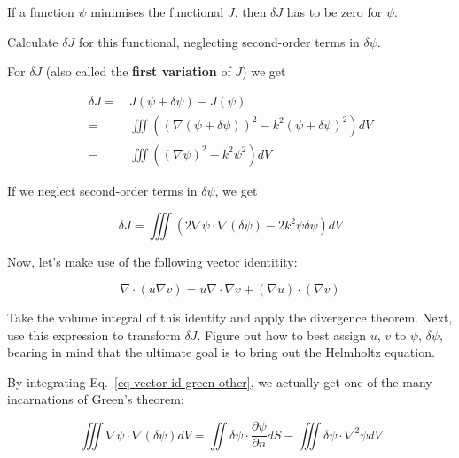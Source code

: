 \noindent{}If a function $\psi$ minimises the functional $J$, then $\delta J$ has to be zero for $\psi$.

\begin{cue}
Calculate $\delta J$ for this functional, neglecting second-order terms in $\delta \psi$.
\end{cue}

\noindent{}For $\delta J$ (also called the \textbf{first variation} of $J$) we get

\begin{align}
\delta J =& \, J(\psi + \delta \psi) - J(\psi) \nonumber \\
  =& \, \iiint \left( (\nabla (\psi + \delta \psi))^2 - k^2 (\psi + \delta \psi)^2 \right) dV \nonumber   \\
  -& \, \iiint \left((\nabla \psi)^2 - k^2 \psi^2 \right) dV
\end{align} 

If we neglect second-order terms in $\delta \psi$, we get

\begin{equation}
\delta J = \iiint \left( 2 \nabla \psi \cdot \nabla (\delta \psi) - 2 k^2 \psi \delta \psi \right) dV
\end{equation}

Now, let's make use of the following vector identitity:

\begin{equation}
\nabla \cdot (u \nabla v) = u \nabla \cdot \nabla v + (\nabla u) \cdot (\nabla v) \label{eq-vector-id-green-other}
\end{equation} 

\begin{cue}
Take the volume integral of this identity and apply the divergence theorem. Next, use this expression to transform $\delta J$. Figure out how to best assign $u$, $v$ to $\psi$, $\delta \psi$, bearing in mind that the ultimate goal is to bring out the Helmholtz equation.
\end{cue}

By integrating Eq.~\ref{eq-vector-id-green-other}, we actually get one of the many incarnations of Green's theorem:

\begin{equation}
\iiint \nabla \psi \cdot \nabla (\delta \psi) dV = \iint \delta \psi \cdot \frac{\partial \psi}{\partial n} dS - \iiint \delta \psi \cdot \nabla^2 \psi dV
\end{equation} 

